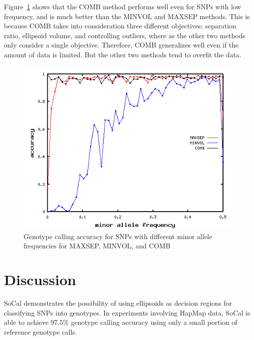 \documentclass{scrartcl}
\begin{document}
\par
Figure~\ref{fig:result_mafacc} shows that the COMB method performs well even
for SNPs with low frequency, and is much better than the MINVOL and MAXSEP
methods.
This is because COMB takes into consideration three different objectives:
separation ratio, ellipsoid volume, and controlling outliers, where as the
other two methods only consider a single objective.
Therefore, COMB generalizes well even if the amount of data is limited.
But the other two methods tend to overfit the data.
\begin{figure}[H]
    \centering
    \includegraphics[scale=0.6]
    {result_figures/result_mafacc.png}
    \caption{Genotype calling accuracy for SNPs with different minor
             allele frequencies for MAXSEP, MINVOL, and COMB}
    \label{fig:result_mafacc}
\end{figure}

\section{Discussion}

\par
SoCal demonstrates the possibility of using ellipsoids as decision
regions for classifying SNPs into genotypes.
In experiments involving HapMap data, SoCal is able to achieve $97.5\%$
genotype calling accuracy using only a small portion of reference genotype
calls.
\end{document}
